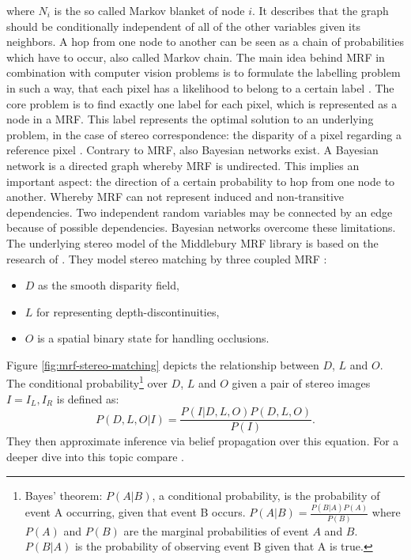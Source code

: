 \noindent where $N_i$ is the so called Markov blanket of node $i$.
It describes that the graph should be conditionally independent of all of the other variables given its neighbors.
A hop from one node to another can be seen as a chain of probabilities which have to occur, also called Markov chain.
The main idea behind MRF in combination with computer vision problems is to formulate the labelling problem in such a way, that each pixel has a likelihood to belong to a certain label \citep{tamassia2013handbook}.
The core problem is to find exactly one label for each pixel, which is represented as a node in a MRF.
This label represents the optimal solution to an underlying problem, in the case of stereo correspondence: the disparity of a pixel regarding a reference pixel \citep{cyganek2011introduction}.
\newline\newline\noindent Contrary to MRF, also Bayesian networks exist.
A Bayesian network is a directed graph whereby MRF is undirected.
This implies an important aspect: the direction of a certain probability to hop from one node to another.
Whereby MRF can not represent induced and non-transitive dependencies.
Two independent random variables may be connected by an edge because of possible dependencies.
Bayesian networks overcome these limitations.
\newline\newline\noindent The underlying stereo model of the Middlebury MRF library is based on the research of \citeauthor{sun2003stereo}.
They model stereo matching by three coupled MRF \citep{sun2003stereo}:
\begin{itemize}
  \item $D$ as the smooth disparity field,
  \item $L$ for representing depth-discontinuities,
  \item $O$ is a spatial binary state for handling occlusions.
\end{itemize}
\noindent Figure \ref{fig:mrf-stereo-matching} depicts the relationship between $D$, $L$ and $O$.
The conditional probability\footnote{Bayes' theorem: $P(A|B)$, a conditional probability, is the probability of event A occurring, given that event B occurs. $P(A|B) = \frac{P(B|A)P(A)}{P(B)}$ where $P(A)$ and $P(B)$ are the marginal probabilities of event $A$ and $B$. $P(B|A)$ is the probability of observing event B given that A is true.} over $D$, $L$ and $O$ given a pair of stereo images $I = {I_L,I_R}$ is defined as:
\begin{equation}
  P(D,L,O|I) = \frac{P(I|D,L,O)P(D,L,O)}{P(I)}.
\end{equation}
They then approximate inference via belief propagation over this equation.
For a deeper dive into this topic compare \citep{sun2003stereo, tamassia2013handbook, cyganek2011introduction, yedidia2003understanding, boykov2001fast, kolmogorov2006convergent, wainwright2005map}.

